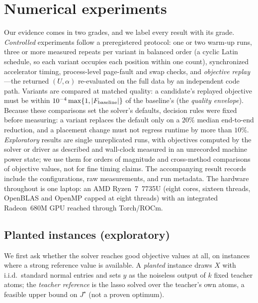 \documentclass[12pt]{article}
\theoremstyle{plain}
\theoremstyle{definition}
\begin{document}
\section{Numerical experiments}\label{s-experiments}

Our evidence comes in two grades, and we label every result with its grade.
\emph{Controlled} experiments follow a preregistered protocol: one or two
warm-up runs, three or more measured repeats per variant in balanced order (a
cyclic Latin schedule, so each variant occupies each position within one
count), synchronized accelerator timing, process-level page-fault and swap
checks, and \emph{objective replay}---the returned $(U,\alpha)$ re-evaluated
on the full data by an independent code path. Variants are compared at
matched quality: a candidate's replayed objective must be within
$10^{-4}\max\{1,|F_{\rm baseline}|\}$ of the baseline's (the \emph{quality
envelope}). Because these comparisons set the solver's defaults, decision
rules were fixed before measuring: a variant replaces the default only on a
$20\%$ median end-to-end reduction, and a placement change must not regress
runtime by more than $10\%$. \emph{Exploratory} results are single
unreplicated runs, with objectives computed by the solver or driver as
described and wall-clock measured in an unrecorded machine power state; we
use them for orders of magnitude and cross-method comparisons of objective
values, not for fine timing claims. The accompanying result records include
the configurations, raw measurements, and run metadata. The hardware
throughout is one laptop: an AMD Ryzen~7~7735U (eight cores, sixteen
threads, OpenBLAS and OpenMP capped at eight threads) with an integrated
Radeon~680M GPU reached through Torch/ROCm.

\subsection{Planted instances (exploratory)}\label{s-exp-planted}

We first ask whether the solver reaches good objective values at all, on
instances where a strong reference value is available. A \emph{planted}
instance draws $X$ with i.i.d.\ standard normal entries and sets $y$ as the
noiseless output of $k$ fixed teacher atoms; the \emph{teacher reference} is
the lasso solved over the teacher's own atoms, a feasible upper bound on
$J^\star$ (not a proven optimum).
\end{document}
